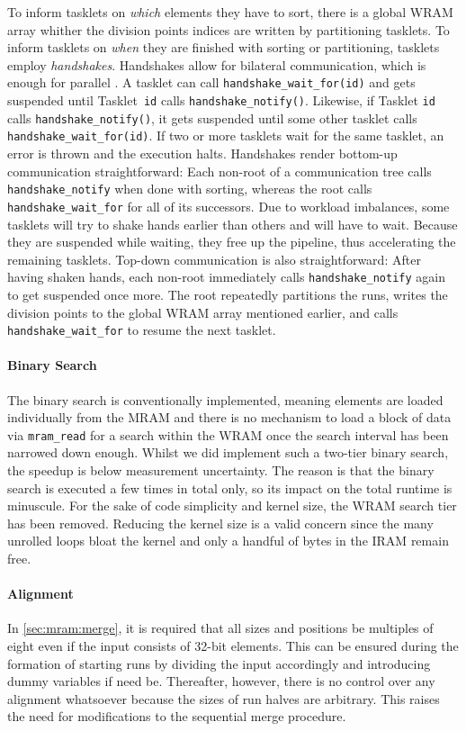 To inform tasklets on \emph{which} elements they have to sort, there is a global \ac{WRAM} array whither the division points indices are written by partitioning tasklets.
To inform tasklets on \emph{when} they are finished with sorting or partitioning, tasklets employ \emph{handshakes}.
Handshakes allow for bilateral communication, which is enough for parallel \MS{}.
A tasklet can call \lstinline|handshake_wait_for(id)| and gets suspended until Tasklet~\lstinline|id| calls \lstinline|handshake_notify()|.
Likewise, if Tasklet \lstinline|id| calls \lstinline|handshake_notify()|, it gets suspended until some other tasklet calls \lstinline|handshake_wait_for(id)|.
If two or more tasklets wait for the same tasklet, an error is thrown and the execution halts.
Handshakes render bottom-up communication straightforward:
Each non-root of a communication tree calls \lstinline|handshake_notify| when done with sorting, whereas the root calls \lstinline|handshake_wait_for| for all of its successors.
Due to workload imbalances, some tasklets will try to shake hands earlier than others and will have to wait.
Because they are suspended while waiting, they free up the pipeline, thus accelerating the remaining tasklets.
Top-down communication is also straightforward:
After having shaken hands, each non-root immediately calls \lstinline|handshake_notify| again to get suspended once more.
The root repeatedly partitions the runs, writes the division points to the global \ac{WRAM} array mentioned earlier, and calls \lstinline|handshake_wait_for| to resume the next tasklet.


\paragraph{Binary Search}
The binary search is conventionally implemented, meaning elements are loaded individually from the \ac{MRAM} and there is no mechanism to load a block of data via \lstinline|mram_read| for a search within the \ac{WRAM} once the search interval has been narrowed down enough.
Whilst we did implement such a two-tier binary search, the speedup is below measurement uncertainty.
The reason is that the binary search is executed a few times in total only, so its impact on the total runtime is minuscule.
For the sake of code simplicity and kernel size, the \ac{WRAM} search tier has been removed.
Reducing the kernel size is a valid concern since the many unrolled loops bloat the kernel and only a handful of bytes in the \ac{IRAM} remain free.


\paragraph{Alignment}
In \cref{sec:mram:merge}, it is required that all sizes and positions be multiples of eight even if the input consists of 32-bit elements.
This can be ensured during the formation of starting runs by dividing the input accordingly and introducing dummy variables if need be.
Thereafter, however, there is no control over any alignment whatsoever because the sizes of run halves are arbitrary.
This raises the need for modifications to the sequential merge procedure.

